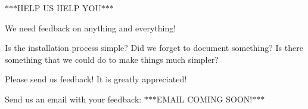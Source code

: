 $\ast$$\ast$$\ast$\-H\-E\-L\-P U\-S H\-E\-L\-P Y\-O\-U$\ast$$\ast$$\ast$

We need feedback on anything and everything!

Is the installation process simple? Did we forget to document something? Is there something that we could do to make things much simpler?

Please send us feedback! It is greatly appreciated!

Send us an email with your feedback\-: $\ast$$\ast$$\ast$\-E\-M\-A\-I\-L C\-O\-M\-I\-N\-G S\-O\-O\-N!$\ast$$\ast$$\ast$ 